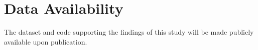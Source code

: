 \documentclass[lettersize,journal]{IEEEtran}
\begin{document}
\section*{Data Availability}
The dataset and code supporting the findings of this study will be made publicly available upon publication.






\newpage






\vfill
\end{document}
